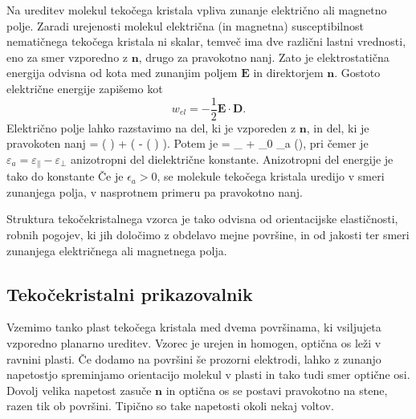 Na ureditev molekul tekočega kristala vpliva zunanje električno ali magnetno polje.
Zaradi urejenosti molekul električna (in magnetna) susceptibilnost nematičnega tekočega
kristala ni skalar, temveč ima dve različni lastni vrednosti,
eno za smer vzporedno z $\mathbf{n}$, drugo za pravokotno nanj. Zato je
elektrostatična energija odvisna od kota med zunanjim poljem $\mathbf{E}$
in direktorjem $\mathbf{n}$. Gostoto električne energije 
zapišemo kot 
\begin{equation}
w_{el}=-\frac{1}{2}\mathbf{E}\cdot \mathbf{D}.
\label{lcwe}
\end{equation}
Električno polje lahko razstavimo na del, ki je vzporeden z $\mathbf{n}$, in del, ki je
pravokoten nanj
\beq
{} = ( \cdot {})  + \left(  - 
( \cdot {})  \right).
\eeq
Potem je 
\beq
{} = \varepsilon \varepsilon_\bot {} + \varepsilon_0 \varepsilon_a
(\cdot{}),
\label{7.56a}
\eeq
pri čemer je $\varepsilon_a = \varepsilon_\parallel - \varepsilon_\bot$ anizotropni
del dielektrične konstante. Anizotropni del energije je tako do konstante
Če je $\epsilon_{a}>0$, se molekule tekočega kristala uredijo v smeri 
zunanjega polja, v nasprotnem primeru pa pravokotno nanj.

Struktura tekočekristalnega vzorca je tako odvisna od orientacijske
elastičnosti, robnih pogojev, ki jih določimo z obdelavo mejne
površine, in od jakosti ter smeri zunanjega električnega ali magnetnega polja.

\subsection*{Tekočekristalni prikazovalnik}
Vzemimo tanko plast tekočega kristala med dvema površinama, ki vsiljujeta
vzporedno planarno ureditev. Vzorec je urejen in homogen, optična os leži v ravnini 
plasti. Če dodamo na površini še prozorni elektrodi, lahko
z zunanjo napetostjo spreminjamo orientacijo molekul v plasti in tako tudi 
smer optične osi. Dovolj velika napetost zasuče $\mathbf{n}$ in optična os
se postavi pravokotno na stene, razen tik ob površini. Tipično so take napetosti okoli 
nekaj voltov.

